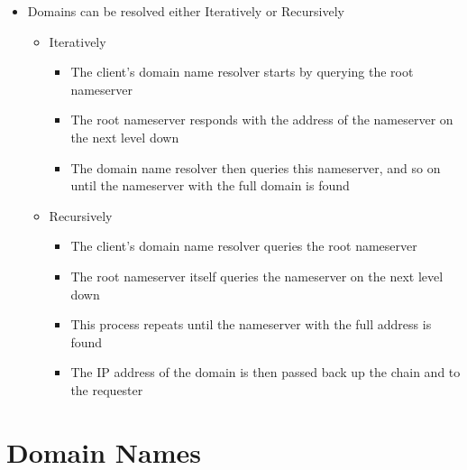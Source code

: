 \begin{itemize}
\begin{itemize}
\begin{itemize}
    \end{itemize}
  \end{itemize}
  \item Domains can be resolved either Iteratively or Recursively
  \begin{itemize}
    \item Iteratively
    \begin{itemize}
      \item The client's domain name resolver starts by querying the root nameserver
      \item The root nameserver responds with the address of the nameserver on the next level down
      \item The domain name resolver then queries this nameserver, and so on until the nameserver with the full domain is found
    \end{itemize}
    \item Recursively
    \begin{itemize}
      \item The client's domain name resolver queries the root nameserver
      \item The root nameserver itself queries the nameserver on the next level down
      \item This process repeats until the nameserver with the full address is found
      \item The IP address of the domain is then passed back up the chain and to the requester
    \end{itemize}
  \end{itemize}
\end{itemize}

\section*{Domain Names}

